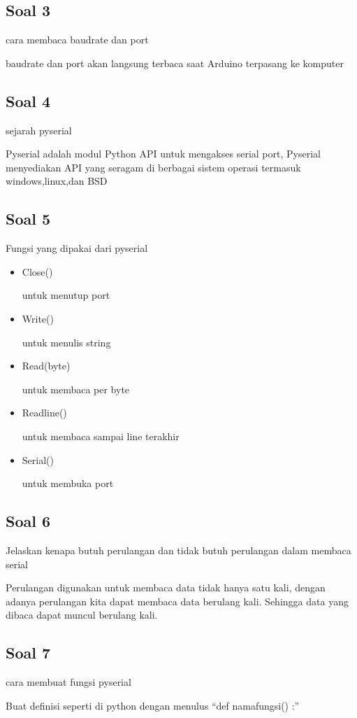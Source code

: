 \subsection{Soal 3}
cara membaca baudrate dan port

baudrate dan port akan langsung terbaca saat Arduino terpasang ke komputer

\subsection{Soal 4}
sejarah pyserial

Pyserial adalah modul Python API untuk mengakses serial port, Pyserial menyediakan API yang seragam di berbagai sistem operasi termasuk windows,linux,dan BSD

\subsection{Soal 5}
Fungsi yang dipakai dari pyserial

\begin{itemize}
	\item Close()

	untuk menutup port

	\item Write()

	untuk menulis string

	\item Read(byte)

	untuk membaca per byte

	\item Readline()

	untuk membaca sampai line terakhir

	\item Serial()

	untuk membuka port

\end{itemize}
\subsection{Soal 6}
Jelaskan kenapa butuh perulangan dan tidak butuh perulangan dalam membaca serial

Perulangan digunakan untuk membaca data tidak hanya satu kali, dengan adanya perulangan kita dapat membaca data berulang kali. Sehingga data yang dibaca dapat muncul berulang kali.

\subsection{Soal 7}
cara membuat fungsi pyserial

Buat definisi seperti di python dengan menulus “def namafungsi() :”


